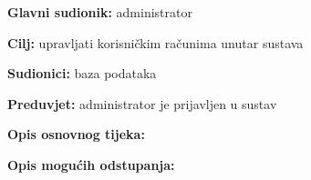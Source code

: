                     \noindent {}
					\begin{packed_item}
	
						\item \textbf{Glavni sudionik: }administrator
						\item  \textbf{Cilj:} upravljati korisničkim računima unutar sustava
						\item  \textbf{Sudionici:} baza podataka
						\item  \textbf{Preduvjet:} administrator je prijavljen u sustav
						\item  \textbf{Opis osnovnog tijeka:}
						
						\item[] \begin{packed_enum}
	
							\item 
							\item 
							\item 

						\end{packed_enum}
						
						\item  \textbf{Opis mogućih odstupanja:}
						
						\item[] \begin{packed_item}
	
							\item[2.a] 
							\item[] \begin{packed_enum}
								
								\item 
								\item 
							\end{packed_enum}
							
						\end{packed_item}
					\end{packed_item}


